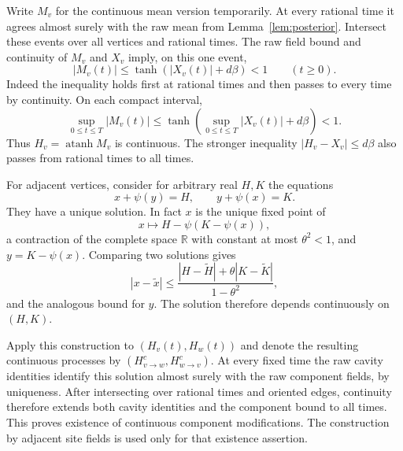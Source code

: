 Write $M_v$ for the continuous mean version temporarily.  At every
rational time it agrees almost surely with the raw mean from
Lemma~\ref{lem:posterior}.  Intersect these events over all vertices
and rational times.  The raw field bound and continuity of $M_v$ and
$X_v$ imply, on this one event,
\[
 |M_v(t)|\le\tanh(|X_v(t)|+d\beta)<1\qquad(t\ge0).
\]
Indeed the inequality holds first at rational times and then passes
to every time by continuity.  On each compact interval,
\[
 \sup_{0\le t\le T}|M_v(t)|
 \le\tanh\left(\sup_{0\le t\le T}|X_v(t)|+d\beta\right)<1 .
\]
Thus $H_v=\operatorname{atanh}M_v$ is continuous.  The stronger
inequality $|H_v-X_v|\le d\beta$ also passes from rational times to
all times.

For adjacent vertices, consider for arbitrary real $H,K$ the equations
\[
 x+\psi(y)=H,\qquad y+\psi(x)=K.
\]
They have a unique solution.  In fact $x$ is the unique fixed point of
\[
 x\longmapsto H-\psi(K-\psi(x)),
\]
a contraction of the complete space $\mathbb R$ with constant at
most $\theta^2<1$, and $y=K-\psi(x)$.  Comparing two solutions gives
\[
 |x-\widetilde x|
 \le\frac{|H-\widetilde H|+\theta|K-\widetilde K|}{1-\theta^2},
\]
and the analogous bound for $y$.  The solution therefore depends
continuously on $(H,K)$.

Apply this construction to $(H_v(t),H_w(t))$ and denote the resulting
continuous processes by $(H^c_{v\to w},H^c_{w\to v})$.
At every fixed time the raw cavity identities identify this solution
almost surely with the raw component fields, by uniqueness.
After intersecting over rational times and oriented edges, continuity
therefore extends both cavity identities and the component bound to
all times.  This proves existence of continuous component
modifications.  The construction by adjacent site fields is used only
for that existence assertion.

